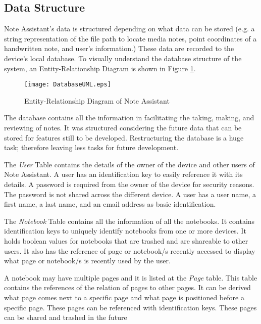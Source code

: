 \subsection{Data Structure}
\label{sec:datastructure}

Note Assistant's data is structured depending on what data can be stored (e.g. a string representation of the file path to locate media notes, point coordinates of a handwritten note, and user's information.) These data are recorded to the device's local database. To visually understand the database structure of the system, an Entity-Relationship Diagram is shown in Figure \ref{fig:erd}.

\begin{figure}[htbp!]
   \centering      
   \texttt{[image: DatabaseUML.eps]} 
   \caption{Entity-Relationship Diagram of Note Assistant}
   \label{fig:erd}
\end{figure}


The database contains all the information in facilitating the taking, making, and reviewing of notes. It was structured considering the future data that can be stored for features still to be developed. Restructuring the database is a huge task; therefore leaving less tasks for future development.

The \textit{User} Table contains the details of the owner of the device and other users of Note Assistant. A user has an identification key to easily reference it with its details. A password is required from the owner of the device for security reasons. The password is not shared across the different device. A user has a user name, a first name, a last name, and an email address as basic identification.

The \textit{Notebook} Table contains all the information of all the notebooks. It contains identification keys to uniquely identify notebooks from one or more devices. It holds boolean values for notebooks that are trashed and are shareable to other users. It also has the reference of page or notebook/s recently accessed to display what page or notebook/s is recently used by the user.

A notebook may have multiple pages and it is listed at the \textit{Page} table. This table contains the references of the relation of pages to other pages. It can be derived what page comes next to a specific page and what page is positioned before a specific page. These pages can be referenced with identification keys. These pages can be shared and trashed in the future 

